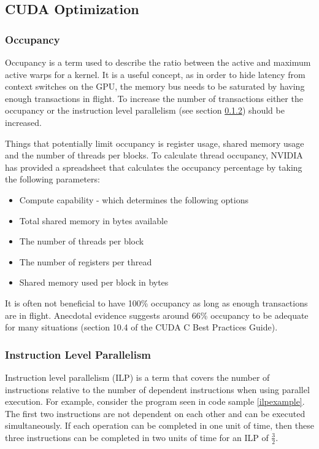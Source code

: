 \subsection{CUDA Optimization}\label{subsec:cudaoptimization}
\subsubsection{Occupancy}\label{subsubsec:occupancy}
Occupancy is a term used to describe the ratio between the active and maximum active warps for a kernel.
It is a useful concept, as in order to hide latency from context switches on the GPU, the memory bus needs to be saturated by having enough transactions in flight.
To increase the number of transactions either the occupancy or the instruction level parallelism (see section \ref{subsubsec:ilp}) should be increased.

Things that potentially limit occupancy is register usage, shared memory usage and the number of threads per blocks.
To calculate thread occupancy, NVIDIA has provided a spreadsheet\cite{occupancycalculator} that calculates the occupancy percentage by taking the following parameters:
\begin{itemize}
\item Compute capability - which determines the following options
\item Total shared memory in bytes available
\item The number of threads per block
\item The number of registers per thread
\item Shared memory used per block in bytes
\end{itemize}

It is often not beneficial to have 100\% occupancy as long as enough transactions are in flight\cite{volkovoccupancy}.
Anecdotal evidence suggests around 66\% occupancy to be adequate for many situations (section 10.4 of the CUDA C Best Practices Guide\cite{cudacoccupancy}).


\subsubsection{Instruction Level Parallelism}\label{subsubsec:ilp}
Instruction level parallelism (ILP) is a term that covers the number of instructions relative to the number of dependent instructions when using parallel execution.
For example, consider the program seen in code sample \ref{ilpexample}.
The first two instructions are not dependent on each other and can be executed simultaneously.
If each operation can be completed in one unit of time, then these three instructions can be completed in two units of time for an ILP of $\frac{3}{2}$.

